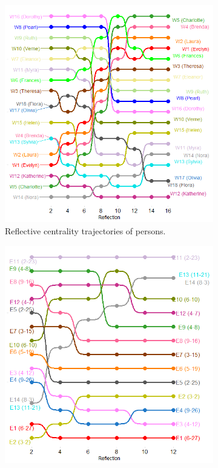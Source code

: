 \documentclass[a4paper,fleqn]{cas-sc}
\begin{document}
\begin{figure}[ht!]
    \captionsetup[subfigure]{font=footnotesize,labelfont=footnotesize}
    \centering
     \begin{subfigure}[b]{0.45\textwidth}
        \includegraphics[width=1.0\textwidth]{Plots/p-reflections.png}
            \caption{Reflective centrality trajectories of persons.}
            \label{fig:p-refs}
    \end{subfigure}
     \begin{subfigure}[b]{0.45\textwidth}
        \includegraphics[width=1.0\textwidth]{Plots/g-reflections.png}

\end{subfigure}
\end{figure}
\end{document}
